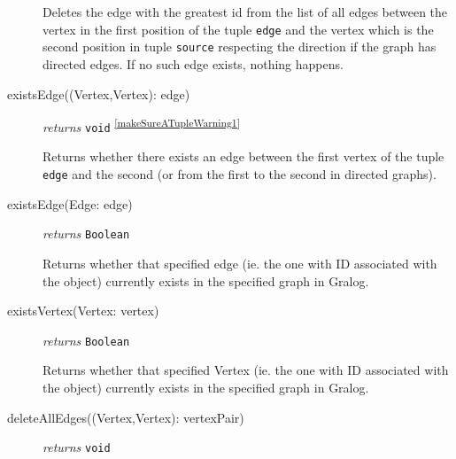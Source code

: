 \documentclass{article}
\begin{document}
\begin{description}
  Deletes the edge with the greatest id from the list of all edges
  between the vertex in the first position of the tuple \texttt{edge} and the vertex which is the second position in tuple \texttt{source} respecting
  the direction if the graph has directed edges. If no such edge exists, nothing happens.




\item[existsEdge((Vertex,Vertex): edge)] \emph{returns}
  \texttt{void} \textsuperscript{\ref{makeSureATupleWarning1}}

  Returns whether there exists an edge between the first vertex of the tuple \texttt{edge} and the second (or from the first to the second in directed graphs).
  
  
\item[existsEdge(Edge: edge)] \emph{returns}
  \texttt{Boolean}

  Returns whether that specified edge (ie. the one with ID associated with the object) currently exists in the specified graph in Gralog. 
  

  
\item[existsVertex(Vertex: vertex)] \emph{returns}
  \texttt{Boolean}

  Returns whether that specified Vertex (ie. the one with ID associated with the object) currently exists in the specified graph in Gralog. 
  



\item[deleteAllEdges((Vertex,Vertex): vertexPair)] \emph{returns}
  \texttt{void}


\end{description}
\end{document}
